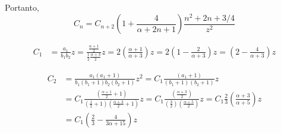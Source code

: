 \documentclass[10pt,a4paper]{article}%
\begin{document}
Portanto,
\begin{equation}
C_n = C_{n+2} \left(1+\frac{4}{\alpha+2n+1}\right) \frac{n^2+2n+3/4}{z^2}
\end{equation}

\begin{equation}
\begin{split}
C_1 &= \frac{a_1}{b_1 b_2} z = \frac{\frac{\alpha+1}{2}}{\frac{1}{2} \frac{\alpha+3}{2}} z
= 2\left(\frac{\alpha+1}{\alpha+3}\right) z =
2\left(1-\frac{2}{\alpha+3}\right) z =
\left(2-\frac{4}{\alpha+3}\right) z
\end{split}
\end{equation}

\begin{equation}
\begin{split}
C_2 &= \frac{a_1(a_1+1)}{b_1(b_1+1) b_2(b_2+1)} z^2 = 
C_1 \frac{(a_1+1)}{(b_1+1) (b_2+1)} z \\
&=
C_1 \frac{(\frac{\alpha+1}{2}+1)}{(\frac{1}{2}+1) (\frac{\alpha+3}{2}+1)} z =
C_1 \frac{(\frac{\alpha+3}{2})}{(\frac{3}{2}) (\frac{\alpha+5}{2})} z = 
C_1 \frac{2}{3} \left(\frac{\alpha+3}{\alpha+5}\right) z \\
&=
C_1 \left(\frac{2}{3}-\frac{4}{3\alpha+15}\right) z
\end{split}
\end{equation}
\end{document}
